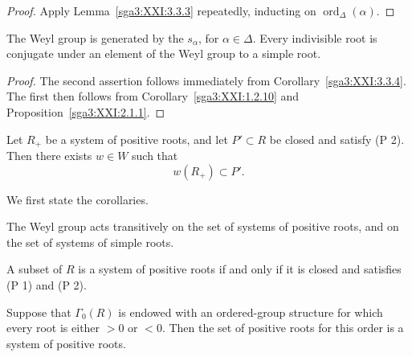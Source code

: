 \begin{proof}
Apply Lemma~\ref{sga3:XXI:3.3.3} repeatedly, inducting on
\(\operatorname{ord}_\Delta(\alpha)\).
\end{proof}

\begin{proposition}\label{sga3:XXI:3.3.5}
The Weyl group is generated by the \(s_\alpha\), for
\(\alpha\in\Delta\). Every indivisible root is conjugate under an
element of the Weyl group to a simple root.
\end{proposition}

\begin{proof}
The second assertion follows immediately from
Corollary~\ref{sga3:XXI:3.3.4}. The first then follows from
Corollary~\ref{sga3:XXI:1.2.10} and
Proposition~\ref{sga3:XXI:2.1.1}.
\end{proof}

\begin{proposition}\label{sga3:XXI:3.3.6}
Let \(R_+\) be a system of positive roots, and let \(P'\subset R\) be
closed and satisfy (P 2). Then there exists \(w\in W\) such that
\[
 w(R_+)\subset P'.
\]
\end{proposition}

We first state the corollaries.

\begin{corollary}\label{sga3:XXI:3.3.7}
The Weyl group acts transitively on the set of systems of positive
roots, and on the set of systems of simple roots.
\end{corollary}

\begin{corollary}\label{sga3:XXI:3.3.8}
A subset of \(R\) is a system of positive roots if and only if it is
closed and satisfies (P 1) and (P 2).
\end{corollary}

\begin{corollary}\label{sga3:XXI:3.3.9}
Suppose that \(\Gamma_0(R)\) is endowed with an ordered-group
structure for which every root is either \(>0\) or \(<0\). Then the
set of positive roots for this order is a system of positive roots.
\end{corollary}
